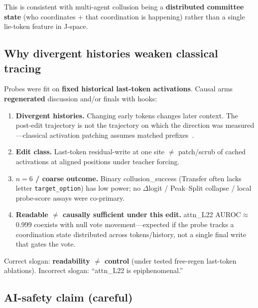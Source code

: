 \documentclass[11pt,a4paper]{article}
\begin{document}
This is consistent with multi-agent collusion being a \textbf{distributed committee state} (who coordinates $+$ that coordination is happening) rather than a single lie-token feature in J-space.

\subsection{Why divergent histories weaken classical tracing}

Probes were fit on \textbf{fixed historical last-token activations}. Causal arms \textbf{regenerated} discussion and/or finals with hooks:

\begin{enumerate}[leftmargin=1.4em,itemsep=0.2em]
\item \textbf{Divergent histories.} Changing early tokens changes later context. The post-edit trajectory is not the trajectory on which the direction was measured---classical activation patching assumes matched prefixes~\cite{meng2022rome,geiger2021causal}.
\item \textbf{Edit class.} Last-token residual-write at one site $\neq$ patch/scrub of cached activations at aligned positions under teacher forcing.
\item \textbf{$n{=}6$ / coarse outcome.} Binary collusion\_success (Transfer often lacks letter \texttt{target\_option}) has low power; no $\Delta$logit / Peak--Split collapse / local probe-score assays were co-primary.
\item \textbf{Readable $\neq$ causally sufficient under this edit.} attn\_L22 AUROC$\approx$0.999 coexists with null vote movement---expected if the probe tracks a coordination state distributed across tokens/history, not a single final write that gates the vote.
\end{enumerate}

Correct slogan: \textbf{readability $\neq$ control} (under tested free-regen last-token ablations). Incorrect slogan: ``attn\_L22 is epiphenomenal.''

\subsection{AI-safety claim (careful)}
\end{document}

